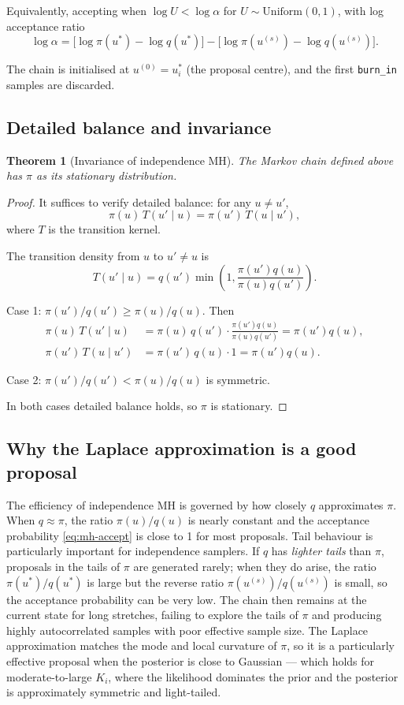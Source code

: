 \documentclass[11pt,a4paper]{article}
\newtheorem{theorem}{Theorem}[section]
\theoremstyle{definition}
\theoremstyle{remark}
\newcommand{\given}{\mid}
\begin{document}
Equivalently, accepting when $\log U < \log\alpha$ for $U \sim \mathrm{Uniform}(0,1)$,
with log acceptance ratio
\[
  \log\alpha = \bigl[\log\pi(u^*) - \log q(u^*)\bigr]
             - \bigl[\log\pi(u^{(s)}) - \log q(u^{(s)})\bigr].
\]

The chain is initialised at $u^{(0)} = u_i^*$ (the proposal centre), and
the first \texttt{burn\_in} samples are discarded.

\subsection{Detailed balance and invariance}

\begin{theorem}[Invariance of independence MH]
The Markov chain defined above has $\pi$ as its stationary distribution.
\end{theorem}

\begin{proof}
It suffices to verify detailed balance: for any $u \neq u'$,
\[
  \pi(u)\,T(u' \given u) = \pi(u')\,T(u \given u'),
\]
where $T$ is the transition kernel.

The transition density from $u$ to $u' \neq u$ is
\[
  T(u' \given u) = q(u')\min\!\left(1,\frac{\pi(u')q(u)}{\pi(u)q(u')}\right).
\]

Case 1: $\pi(u')/q(u') \geq \pi(u)/q(u)$.  Then
\begin{align*}
  \pi(u)\,T(u'\given u)
    &= \pi(u)\,q(u')\cdot\frac{\pi(u')q(u)}{\pi(u)q(u')} = \pi(u')q(u),\\
  \pi(u')\,T(u\given u')
    &= \pi(u')\,q(u)\cdot 1 = \pi(u')q(u).
\end{align*}

Case 2: $\pi(u')/q(u') < \pi(u)/q(u)$ is symmetric.

In both cases detailed balance holds, so $\pi$ is stationary.
\end{proof}

\subsection{Why the Laplace approximation is a good proposal}

The efficiency of independence MH is governed by how closely $q$ approximates
$\pi$.  When $q \approx \pi$, the ratio $\pi(u)/q(u)$ is nearly constant and
the acceptance probability \eqref{eq:mh-accept} is close to 1 for most
proposals.  Tail behaviour is particularly important for independence samplers.
If $q$ has \emph{lighter tails} than $\pi$, proposals in the tails of $\pi$
are generated rarely; when they do arise, the ratio $\pi(u^*)/q(u^*)$ is
large but the reverse ratio $\pi(u^{(s)})/q(u^{(s)})$ is small, so the
acceptance probability can be very low.  The chain then remains at the
current state for long stretches, failing to explore the tails of $\pi$
and producing highly autocorrelated samples with poor effective sample size.  The Laplace approximation matches the
mode and local curvature of $\pi$, so it is a particularly effective proposal
when the posterior is close to Gaussian — which holds for moderate-to-large
$K_i$, where the likelihood dominates the prior and the posterior is
approximately symmetric and light-tailed.
\end{document}
